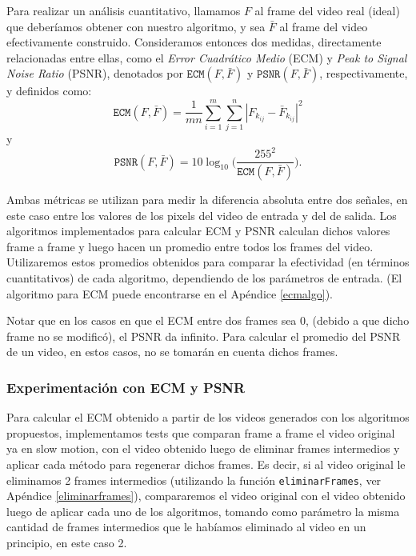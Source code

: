 \par Para realizar un an\'alisis cuantitativo, llamamos $F$ al frame del video real (ideal) que deber\'iamos obtener con nuestro algoritmo, y sea $\bar{F}$ al frame del video efectivamente construido. Consideramos entonces dos medidas, directamente relacionadas entre ellas, como el \emph{Error Cuadr\'atico Medio} (ECM) y \emph{Peak to Signal Noise Ratio} (PSNR), denotados por $\texttt{ECM}(F,\bar{F})$ y $\texttt{PSNR}(F,\bar{F})$, respectivamente, y definidos como:
\begin{equation*}
\texttt{ECM}(F,\bar{F}) = \frac{1}{mn}\sum_{i=1}^m\sum_{j = 1}^n |F_{k_{ij}} - \bar{F}_{k_{ij}}|^2 \label{eq:ecm}
\end{equation*}
\noindent y
\begin{equation*}
\texttt{PSNR}(F,\bar{F}) = 10 \log_{10}\bigg(\frac{255^2}{\texttt{ECM}(F,\bar{F})}\bigg). \label{eq:psnr}
\end{equation*}
\par Ambas métricas se utilizan para medir la diferencia absoluta entre dos señales, en este caso entre los valores de los pixels del video de entrada y del de salida. Los algoritmos implementados para calcular ECM y PSNR calculan dichos valores frame a frame y luego hacen un promedio entre todos los frames del video. Utilizaremos estos promedios obtenidos para comparar la efectividad (en términos cuantitativos) de cada algoritmo, dependiendo de los parámetros de entrada. (El algoritmo para ECM puede encontrarse en el Apéndice \ref{ecmalgo}). 
\par Notar que en los casos en que el ECM entre dos frames sea 0, (debido a que dicho frame no se modificó), el PSNR da infinito. Para calcular el promedio del PSNR de un video, en estos casos, no se tomarán en cuenta dichos frames.

\subsubsection{Experimentación con ECM y PSNR}

\par Para calcular el ECM obtenido a partir de los videos generados con los algoritmos propuestos, implementamos tests que comparan frame a frame el video original ya en slow motion, con el video obtenido luego de eliminar frames intermedios y aplicar cada método para regenerar dichos frames. Es decir, si al video original le eliminamos 2 frames intermedios (utilizando la función \texttt{eliminarFrames}, ver Apéndice \ref{eliminarframes}), compararemos el video original con el video obtenido luego de aplicar cada uno de los algoritmos, tomando como parámetro la misma cantidad de frames intermedios que le habíamos eliminado al video en un principio, en este caso 2.

